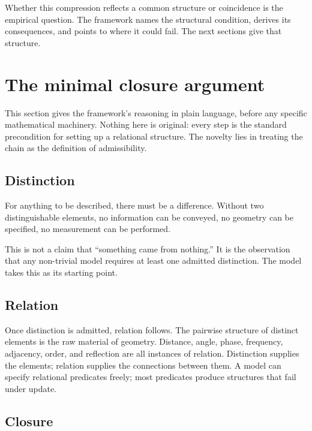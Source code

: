 \documentclass[11pt]{article}
\theoremstyle{plain}
\theoremstyle{definition}
\theoremstyle{remark}
\begin{document}
Whether this compression reflects a common structure or coincidence is the empirical question. The framework names the structural condition, derives its consequences, and points to where it could fail. The next sections give that structure.

\section{The minimal closure argument}\label{sec:minimal}

This section gives the framework's reasoning in plain language, before any specific mathematical machinery. Nothing here is original: every step is the standard precondition for setting up a relational structure. The novelty lies in treating the chain as the definition of admissibility.

\subsection{Distinction}

For anything to be described, there must be a difference. Without two distinguishable elements, no information can be conveyed, no geometry can be specified, no measurement can be performed.

This is not a claim that ``something came from nothing.'' It is the observation that any non-trivial model requires at least one admitted distinction. The model takes this as its starting point.

\subsection{Relation}

Once distinction is admitted, relation follows. The pairwise structure of distinct elements is the raw material of geometry. Distance, angle, phase, frequency, adjacency, order, and reflection are all instances of relation. Distinction supplies the elements; relation supplies the connections between them. A model can specify relational predicates freely; most predicates produce structures that fail under update.

\subsection{Closure}
\end{document}
